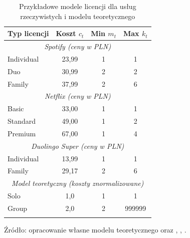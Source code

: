 \begin{table}[h!]
  \centering
  \caption{Przykładowe modele licencji dla usług rzeczywistych i modelu teoretycznego}
  \begin{tabular}{lccc}
    \hline
    \textbf{Typ licencji} & \textbf{Koszt $c_t$} & \textbf{Min $m_t$} & \textbf{Max $k_t$} \\
    \hline
    \multicolumn{4}{c}{\textit{Spotify (ceny w PLN)}}                                      \\
    Individual            & 23,99                & 1                  & 1                  \\
    Duo                   & 30,99                & 2                  & 2                  \\
    Family                & 37,99                & 2                  & 6                  \\
    \hline
    \multicolumn{4}{c}{\textit{Netflix (ceny w PLN)}}                                      \\
    Basic                 & 33,00                & 1                  & 1                  \\
    Standard              & 49,00                & 1                  & 2                  \\
    Premium               & 67,00                & 1                  & 4                  \\
    \hline
    \multicolumn{4}{c}{\textit{Duolingo Super (ceny w PLN)}}                               \\
    Individual            & 13,99                & 1                  & 1                  \\
    Family                & 29,17                & 2                  & 6                  \\
    \hline
    \multicolumn{4}{c}{\textit{Model teoretyczny (koszty znormalizowane)}}                 \\
    Solo                  & 1,0                  & 1                  & 1                  \\
    Group                 & 2,0                  & 2                  & 999999             \\
    \hline
    \label{tab:license_models_real}
  \end{tabular}

  Źródło: opracowanie własne modelu teoretycznego oraz \cite{spotify_price2024}, \cite{spotify_price2025}, \cite{duolingo_app2024}.

\end{table}


